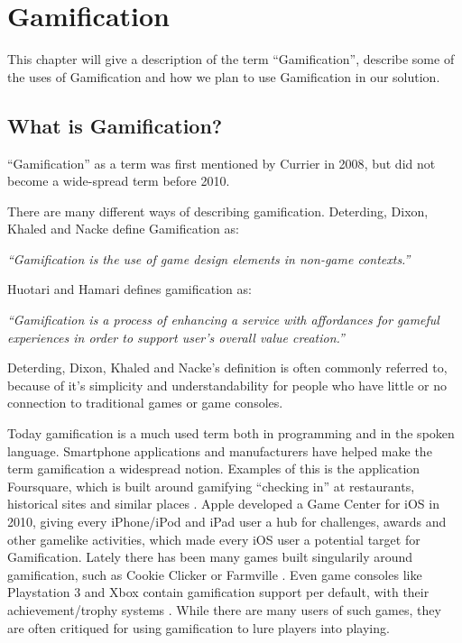 \chapter{Gamification}
\label{chp:gamification}

This chapter will give a description of the term ``Gamification'', describe some of the uses of Gamification and how we plan to use Gamification in our solution.

\section{What is Gamification?}
\label{sec:whatisgamification}
``Gamification'' as a term was first mentioned by Currier in 2008\cite{gamificationcurrier}, but did not become a wide-spread term before 2010. 

There are many different ways of describing gamification. Deterding, Dixon, Khaled and Nacke\cite{Deterding:2011:GDE:2181037.2181040} define Gamification as:

\textit{``Gamification is the use of game design elements in non-game
contexts.''}

Huotari and Hamari\cite{huotari2012defining} defines gamification as:

\textit{``Gamification is a process of enhancing a service with affordances for gameful experiences in order to support user's overall value creation.''}

Deterding, Dixon, Khaled and Nacke's definition is often commonly referred to, because of it's simplicity and understandability for people who have little or no connection to traditional games or game consoles.

Today gamification is a much used term both in programming and in the spoken language. Smartphone applications and manufacturers have helped make the term gamification a widespread notion. Examples of this is the application Foursquare, which is built around gamifying ``checking in'' at restaurants, historical sites and similar places . Apple developed a Game Center for iOS in 2010, giving every iPhone/iPod and iPad user a hub for challenges, awards and other gamelike activities, which made every iOS user a potential target for Gamification. Lately there has been many games built singularily around gamification, such as Cookie Clicker  or Farmville . Even game consoles like Playstation 3 and Xbox contain gamification support per default, with their achievement/trophy systems . While there are many users of such games, they are often critiqued for using gamification to lure players into playing. 


